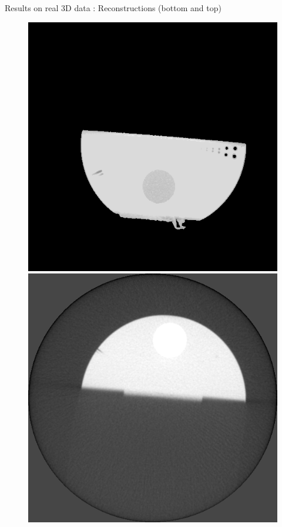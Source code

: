 \documentclass[latex]{beamer}
\begin{document}
\begin{frame}{}
\begin{block}{Results on real 3D data : Reconstructions (bottom and top)}
\begin{figure}
\begin{minipage}[htb]{0.30\linewidth}
\end{minipage} \hfill
\begin{minipage}[htb]{0.30\linewidth}
\centering
\includegraphics[scale=0.19]{volumeIQI_JMAPPottsIndGamma3K4Proj300Bas.png}
\end{minipage} \vfill
\begin{minipage}[htb]{0.30\linewidth}
\centering
\includegraphics[scale=0.19]{volume_FDKProj300Haut.png}

\end{minipage}
\end{figure}
\end{block}
\end{frame}
\end{document}
